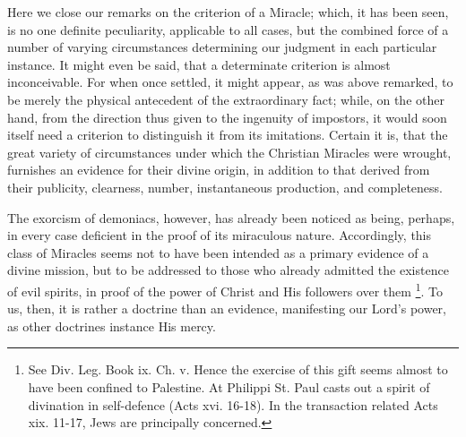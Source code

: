 Here we close our remarks on the criterion of a
Miracle; which, it has been seen, is no one definite peculiarity,
applicable to all cases, but the combined force of a number of varying
circumstances determining our judgment in each particular instance. It
might even be said, that a determinate criterion is almost
inconceivable. For when once settled, it might appear, as was
above remarked, to be merely the physical antecedent of the
extraordinary fact; while, on the other hand, from the direction thus
given to the ingenuity of impostors, it would soon itself need a
criterion to distinguish it from its imitations. Certain it is, that
the great variety of circumstances under which the Christian Miracles
were wrought, furnishes an evidence for their divine origin, in
addition to that derived from their publicity, clearness, number,
instantaneous production, and completeness.

The exorcism of demoniacs, however, has already
been noticed as being, perhaps, in every case deficient in the proof
of its miraculous nature. Accordingly, this class of Miracles seems
not to have been intended as a primary evidence of a divine mission,
but to be addressed to those who already admitted the existence of
evil spirits, in proof of the power of Christ and His followers over
them \footnote{See Div. Leg. Book ix. Ch. v. Hence the exercise of this gift seems
almost to have been confined to Palestine. At Philippi St. Paul casts
out a spirit of divination in self-defence (Acts xvi. 16-18). In the
transaction related Acts xix. 11-17, Jews are principally concerned.}. To us, then, it
is rather a doctrine than an evidence, manifesting our Lord's power,
as other doctrines instance His mercy.

